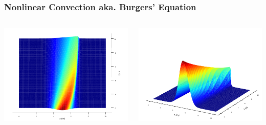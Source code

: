 \begin{frame}
  \frametitle{Nonlinear Convection aka. Burgers' Equation}
  \begin{columns}
    \begin{center}
      \includegraphics[height=.7\textheight]{../BurgersEquation/images/Implicit_top.pdf}
    \end{center}
    \begin{center}
      \includegraphics[height=.7\textheight]{../BurgersEquation/images/Implicit_front.pdf}
    \end{center}
  \end{columns}
\end{frame}

